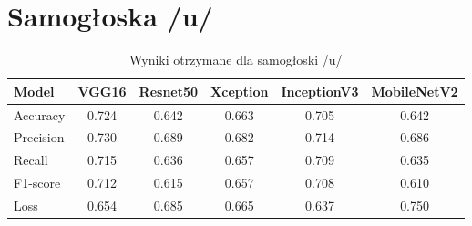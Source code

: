 
\section{Samogłoska /u/}
\label{sec:samogloska-u}

\begin{table}[ht]
\centering
\caption{Wyniki otrzymane dla samogłoski /u/}
\label{tab:wyniki-u}
\begin{tabular}{|l|c|c|c|c|c|}
\hline
\textbf{Model} &\textbf{VGG16} &\textbf{Resnet50} &\textbf{Xception} &\textbf{InceptionV3} &\textbf{MobileNetV2} \\ \hline
    Accuracy &0.724 &0.642 &0.663 &0.705 &0.642 \\ \hline
    Precision &0.730 &0.689 &0.682 &0.714 &0.686 \\ \hline
    Recall &0.715 &0.636 &0.657 &0.709 &0.635 \\ \hline
    F1-score &0.712 &0.615 &0.657 &0.708 &0.610 \\ \hline
    Loss &0.654 &0.685 &0.665 &0.637 &0.750 \\ \hline
\end{tabular}
\end{table}

